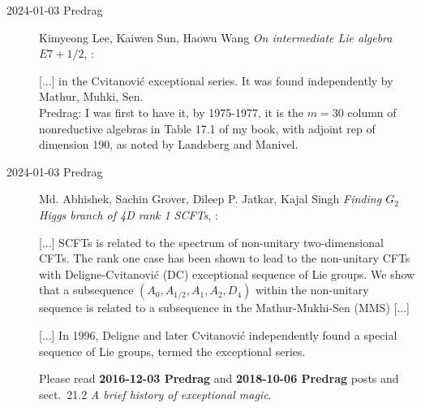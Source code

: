 \begin{description}
\item[2024-01-03 Predrag]
Kimyeong Lee, Kaiwen Sun, Haowu Wang
{\em On intermediate Lie algebra $E7+1/2$},
:

[...] in the Cvitanovi{\'c} exceptional series. It was found independently
by Mathur, Muhki, Sen.
\\
Predrag:  I was first to have it, by 1975-1977, it is the $m=30$ column of
nonreductive algebras in Table 17.1 of my book, with adjoint rep of
dimension 190, as noted by Landsberg and Manivel.

\item[2024-01-03 Predrag]
Md. Abhishek, Sachin Grover, Dileep P. Jatkar, Kajal Singh %
{\em Finding $G_2$ Higgs branch of 4D rank 1 SCFTs},
:

[...] SCFTs is related to the spectrum of non-unitary two-dimensional
CFTs. The rank one case has been shown to lead to the non-unitary CFTs
with Deligne-Cvitanovi{\'c} (DC) exceptional sequence of Lie groups. We show
that a subsequence $(A_0,A_{1/2},A_1,A_2,D_4)$ within the non-unitary sequence is
related to a subsequence in the Mathur-Mukhi-Sen (MMS) [...]

[...]
In 1996, Deligne and later Cvitanovi{\'c} independently found a special sequence
of Lie groups, termed the exceptional series.

Please read {\bf 2016-12-03 Predrag} and {\bf 2018-10-06 Predrag}
posts and
{sect.~21.2} {\em A brief history of exceptional magic}.




\end{description}
\renewcommand{\ssp}{a}


\printbibliography[heading=subbibintoc,title={References}]
